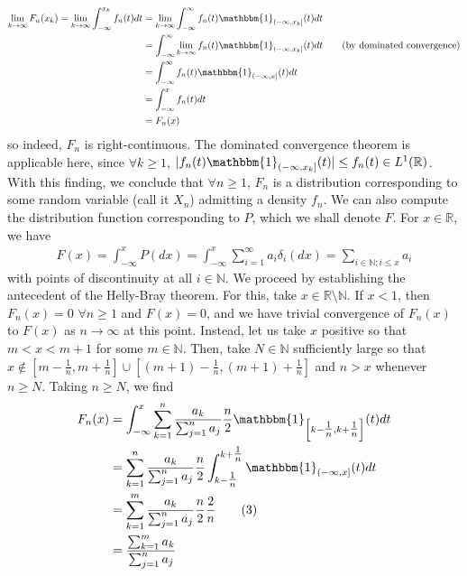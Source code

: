 \documentclass[10pt]{article}
\newcommand{\mbb}[1]{\mathbb{#1}}
\newcommand{\1}[1]{\mathbbm{1}_{#1}}
\begin{document}
    \begin{align*}
        \lim_{k\rightarrow\infty}F_n(x_k)=\lim_{k\rightarrow\infty}\int_{-\infty}^{x_k}f_n(t)dt&=\lim_{k\rightarrow\infty}\int_{-\infty}^\infty f_n(t)\1{(-\infty,x_k]}(t)dt\\
        &=\int_{-\infty}^\infty \lim_{k\rightarrow\infty}f_n(t)\1{(-\infty,x_k]}(t)dt\tag{by dominated convergence}\\
        &=\int_{-\infty}^\infty f_n(t)\1{(-\infty,x]}(t)dt\\
        &=\int_{-\infty}^xf_n(t)dt\\
        &=F_n(x)
    \end{align*}
    so indeed, $F_n$ is right-continuous. The dominated convergence theorem is applicable here, since $\forall k\geq 1$, $|f_n(t)\1{(-\infty,x_k]}(t)|\leq f_n(t)\in L^1(\mbb{R})$. \\[5pt]
    With this finding, we conclude that $\forall n\geq 1$, $F_n$ is a distribution corresponding to some random variable (call it $X_n$)
    admitting a density $f_n$. We can also compute the distribution function corresponding to $P$, which we shall denote $F$. For $x\in\mbb{R}$, we have
    \begin{align*}
        F(x)=\int_{-\infty}^xP(dx)=\int_{-\infty}^x\sum_{i=1}^\infty a_i\delta_i(dx)=\sum_{i\in\mbb{N}:i\leq x}a_i
    \end{align*}
    with points of discontinuity at all $i\in\mbb{N}$. We proceed by establishing the antecedent of the Helly-Bray theorem. For this, take $x\in\mbb{R}\setminus\mbb{N}$. If $x<1$, then $F_n(x)=0$ $\forall n\geq 1$ and $F(x)=0$, and we have trivial convergence of $F_n(x)$ to $F(x)$ as $n\rightarrow\infty$ at this point.
    Instead, let us take $x$ positive so that $m<x<m+1$ for some $m\in\mbb{N}$. Then, take $N\in\mbb{N}$ sufficiently large so that $x\notin\left[m-\tfrac{1}{n},m+\tfrac{1}{n}\right]\cup\left[(m+1)-\tfrac{1}{n},(m+1)+\tfrac{1}{n}\right]$ and $n>x$ whenever $n\geq N$. Taking $n\geq N$, we find
    \begin{align*}
        F_n(x)&=\int_{-\infty}^x\sum_{k=1}^n\frac{a_k}{\sum_{j=1}^n a_j}\frac{n}{2}\1{\left[k-\tfrac{1}{n},k+\tfrac{1}{n}\right]}(t)dt\\
        &=\sum_{k=1}^n\frac{a_k}{\sum_{j=1}^na_j}\frac{n}{2}\int_{k-\tfrac{1}{n}}^{k+\tfrac{1}{n}}\1{(-\infty,x]}(t)dt\\
        &=\sum_{k=1}^m\frac{a_k}{\sum_{j=1}^n a_j}\frac{n}{2}\frac{2}{n}\tag{3}\\
        &=\frac{\sum_{k=1}^ma_k}{\sum_{j=1}^na_j}
    \end{align*}
\end{document}
